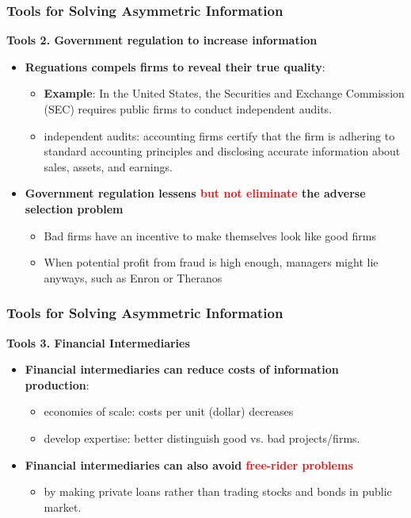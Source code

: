 \documentclass[aspectratio=169]{beamer}
\begin{document}
\begin{frame}
\frametitle{Tools for Solving Asymmetric Information}



\textbf{Tools 2. Government regulation to increase information}
\begin{itemize}
    \item \textbf{Reguations compels firms to reveal their true quality}: 
    \begin{itemize}
        \item \textbf{Example}: In the United States, the Securities and Exchange Commission (SEC) requires public firms to conduct independent audits.
    
        \item independent audits: accounting firms certify that the firm is adhering to standard accounting principles and disclosing accurate information about sales, assets, and earnings.
    \end{itemize}
    \medskip 
    
    \item \textbf{Government regulation lessens \textcolor{red}{but not eliminate} the adverse selection problem}
    \begin{itemize}
        \item Bad firms have an incentive to make themselves look like good firms 
        \item When potential profit from fraud is high enough, managers might lie anyways, such as Enron or Theranos 
    \end{itemize}
\end{itemize}



\end{frame}





\begin{frame}
\frametitle{Tools for Solving Asymmetric Information}



\textbf{Tools 3. Financial Intermediaries}
\begin{itemize}
    \item \textbf{Financial intermediaries can reduce costs of information production}: 
    \begin{itemize}
        \item economies of scale: costs per unit (dollar) decreases
        \item develop expertise: better distinguish good vs. bad projects/firms. 
    \end{itemize}
    \medskip 
    \item \textbf{Financial intermediaries can also avoid \textcolor{red}{free-rider problems}}
    \begin{itemize}
        \item by making private loans rather than trading stocks and bonds in public market.
    \end{itemize}
\end{itemize}


\end{frame}
\end{document}
